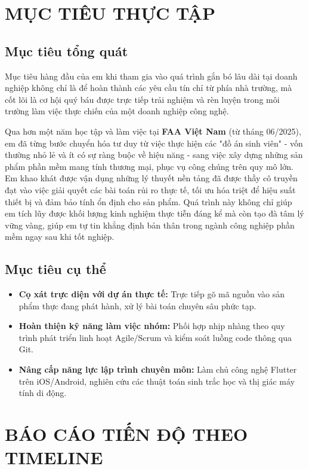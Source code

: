 \documentclass[12pt, a4paper]{article}
\begin{document}
\section{MỤC TIÊU THỰC TẬP}
\subsection{Mục tiêu tổng quát}
Mục tiêu hàng đầu của em khi tham gia vào quá trình gắn bó lâu dài tại doanh nghiệp không chỉ là để hoàn thành các yêu cầu tín chỉ từ phía nhà trường, mà cốt lõi là cơ hội quý báu được trực tiếp trải nghiệm và rèn luyện trong môi trường làm việc thực chiến của một doanh nghiệp công nghệ. 

Qua hơn một năm học tập và làm việc tại \textbf{FAA Việt Nam} (từ tháng 06/2025), em đã từng bước chuyển hóa tư duy từ việc thực hiện các "đồ án sinh viên" - vốn thường nhỏ lẻ và ít có sự ràng buộc về hiệu năng - sang việc xây dựng những sản phẩm phần mềm mang tính thương mại, phục vụ công chúng trên quy mô lớn. Em khao khát được vận dụng những lý thuyết nền tảng đã được thầy cô truyền đạt vào việc giải quyết các bài toán rủi ro thực tế, tối ưu hóa triệt để hiệu suất thiết bị và đảm bảo tính ổn định cho sản phẩm. Quá trình này không chỉ giúp em tích lũy được khối lượng kinh nghiệm thực tiễn đáng kể mà còn tạo đà tâm lý vững vàng, giúp em tự tin khẳng định bản thân trong ngành công nghiệp phần mềm ngay sau khi tốt nghiệp.

\subsection{Mục tiêu cụ thể}
\begin{itemize}
    \item \textbf{Cọ xát trực diện với dự án thực tế:} Trực tiếp gõ mã nguồn vào sản phẩm thực đang phát hành, xử lý bài toán chuyên sâu phức tạp.
    \item \textbf{Hoàn thiện kỹ năng làm việc nhóm:} Phối hợp nhịp nhàng theo quy trình phát triển linh hoạt Agile/Scrum và kiểm soát luồng code thông qua Git.
    \item \textbf{Nâng cấp năng lực lập trình chuyên môn:} Làm chủ công nghệ Flutter trên iOS/Android, nghiên cứu các thuật toán sinh trắc học và thị giác máy tính di động.
\end{itemize}

\section{BÁO CÁO TIẾN ĐỘ THEO TIMELINE}
\end{document}
